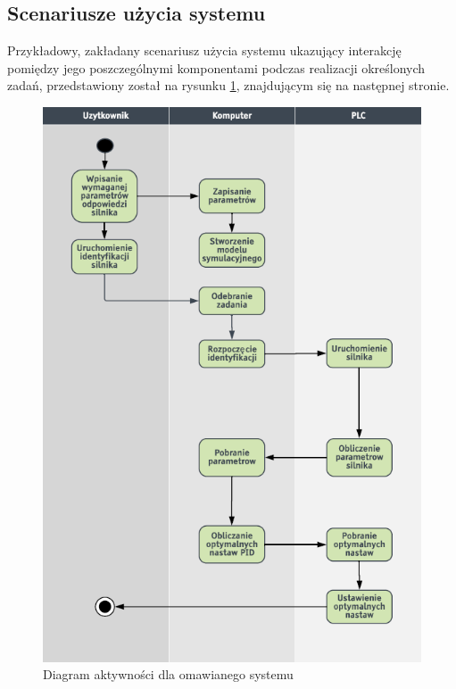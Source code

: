 \subsection{Scenariusze użycia systemu}
\indent Przykładowy, zakładany scenariusz użycia systemu ukazujący interakcję pomiędzy jego poszczególnymi komponentami podczas realizacji określonych zadań, przedstawiony został na rysunku \ref{aktywnosc}, znajdującym się na następnej stronie.\newpage
\begin{figure}[ht!]
\centering
\includegraphics[scale=1]{aktywnosc}
\caption{Diagram aktywności dla omawianego systemu}
\label{aktywnosc}
\end{figure}

\newpage